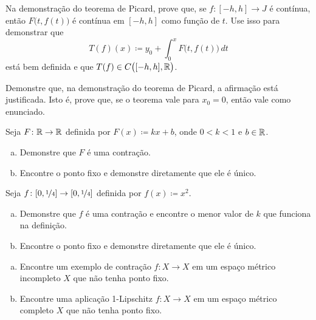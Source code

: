 \begin{exercise}
Na demonstração do teorema de Picard,
prove que, se $f \colon [-h,h] \to J$ é contínua, então $F\bigl(t,f(t)\bigr)$
é contínua em $[-h,h]$ como função de $t$. Use isso para demonstrar que
\begin{equation*}
T(f)(x)
\coloneqq
y_0 + \int_0^x F\bigl(t,f(t)\bigr)\,dt
\end{equation*}
está bem definida e que $T(f) \in C\bigl([-h,h],{\mathbb{R}}\bigr)$.
\end{exercise}


\begin{exercise}
Demonstre que, na demonstração do teorema de Picard,
a afirmação  está
justificada. Isto é, prove que, se o teorema vale para $x_0 = 0$, então
vale como enunciado.
\end{exercise}

\begin{exercise}
\pagebreak[2]
Seja $F \colon {\mathbb{R}} \to {\mathbb{R}}$ definida por
$F(x) \coloneqq kx + b$, onde $0 < k < 1$ e $b \in {\mathbb{R}}$.
\begin{enumerate}[a)]
\item
Demonstre que $F$ é uma contração.
\item
Encontre o ponto fixo e demonstre diretamente que ele é único.
\end{enumerate}
\end{exercise}

\begin{exercise}
\pagebreak[2]
Seja $f \colon [0,\nicefrac{1}{4}] \to [0,\nicefrac{1}{4}]$ definida por
$f(x) \coloneqq x^2$.
\begin{enumerate}[a)]
\item
Demonstre que $f$
é uma contração e encontre o menor valor de $k$ que funciona na definição.
\item
Encontre o ponto fixo e demonstre diretamente que ele é único.
\end{enumerate}
\end{exercise}

\begin{samepage}
\begin{exercise} \label{exercise:nofixedpoint}
\leavevmode
\begin{enumerate}[a)]
\item
Encontre um exemplo de contração $f \colon X \to X$
em um espaço métrico incompleto $X$ que não tenha
ponto fixo.
\item
Encontre uma aplicação 1-Lipschitz $f \colon X \to X$ em um espaço métrico completo $X$ que não tenha ponto fixo.
\end{enumerate}
\end{exercise}
\end{samepage}

